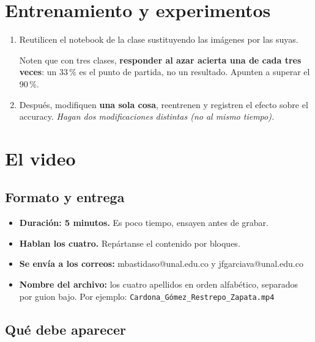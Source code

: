 \documentclass[11pt,a4paper]{article}
\begin{document}
\section{Entrenamiento y experimentos}

\begin{enumerate}
	\item Reutilicen el notebook de la clase sustituyendo las imágenes por las suyas. 
	
	\begin{tcolorbox}[colback=blue!4,colframe=blue!20,boxrule=0.6pt, coltitle=black, title=\textbf{Tres clases}]
		Noten que con tres clases, \textbf{responder al azar acierta una de cada tres veces}: un 33\,\% es
		el punto de partida, no un resultado. Apunten a superar el 90\,\%.
	\end{tcolorbox}
	
	\item Después, modifiquen \textbf{una sola cosa}, reentrenen y registren el efecto sobre el accuracy. \textit{Hagan dos modificaciones distintas (no al mismo tiempo). }
	
\end{enumerate}

\vspace{1cm}

\section{El video}

\subsection{Formato y entrega}

\begin{itemize}
  \item \textbf{Duración: 5 minutos.} Es poco tiempo, ensayen antes de grabar.
  \item \textbf{Hablan los cuatro.} Repártanse el contenido por bloques.
  \item \textbf{Se envía a los correos:} mbastidaso@unal.edu.co y jfgarciava@unal.edu.co
  \item \textbf{Nombre del archivo:} los cuatro apellidos en orden alfabético, separados por guion bajo. Por ejemplo: \texttt{Cardona\_Gómez\_Restrepo\_Zapata.mp4}
\end{itemize}

\subsection{Qué debe aparecer}
\end{document}
